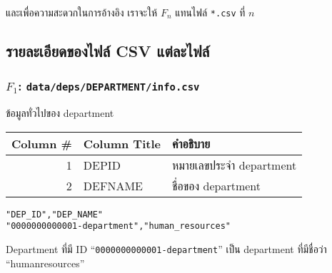 และเพื่อความสะดวกในการอ้างอิง เราจะให้ $ F_n $ แทนไฟล์ \texttt{*.csv} ที่ $ n $

\clearpage

\subsection{รายละเอียดของไฟล์ CSV แต่ละไฟล์}


\begin{minipage}{\textwidth}
\subsubsection{\texorpdfstring{$ F_{1} $}{File \#1}: \texttt{data/deps/DEPARTMENT/info.csv}}\label{subsubsec:csv-f1}

ข้อมูลทั่วไปของ department

\begin{tabular}[!hbt]{| r | >{\ttfamily}p{15ex}<{\rmfamily} | p{36ex} |}
\hline
Column \#       & \rmfamily Column Title                & คำอธิบาย\\
\hline
1               & DEP\textunderscore{}ID                & หมายเลขประจำ department\\
2               & DEF\textunderscore{}NAME              & ชื่อของ department\\
\hline
\end{tabular}


\begin{lstlisting}[caption={\texttt{data/deps/human\textunderscore{}resources/info.csv}}]
"DEP_ID","DEP_NAME"
"0000000000001-department","human_resources"
\end{lstlisting}

\begin{description}[labelwidth=*]
    \item[$ \Rightarrow $]  Department ที่มี ID ``\texttt{0000000000001-department}'' เป็น department ที่มีชื่อว่า ``human\textunderscore{}resources''
\end{description}
\end{minipage}


